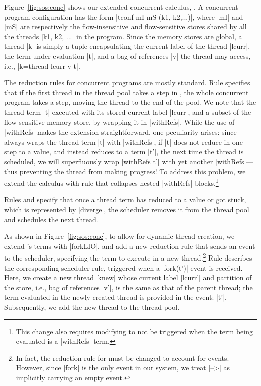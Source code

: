 Figure~\ref{fig:sos:conc} shows our extended concurrent calculus, \lioconc{}.
%
A concurrent program configuration has the form |tconf mI mS (k1, k2,...)|,
where |mI| and |mS| are respectively the flow-insensitive and flow-sensitive
stores shared by all the threads |k1, k2, ...| in the program.
%
Since the memory stores are global, a thread |k| is simply a tuple
encapsulating the current label of the thread |lcurr|, the term under
evaluation |t|, and a bag of references |v| the thread may access, i.e.,
|k=thread lcurr v t|.

The reduction rules for concurrent programs are mostly standard.
%
Rule  specifies that if the first thread in the thread pool
takes a step in \lioafs{}, the whole concurrent program takes a step, moving
the thread to the end of the pool.
%
We note that the thread term |t| executed with its stored current label
|lcurr|, and a subset of the flow-sensitive memory store, by wrapping it in
|withRefs|.
%
While the use of |withRefs| makes the extension straightforward, one
peculiarity arises: since  always wraps the thread term |t|
with |withRefs|, if |t| does not reduce in one step to a value, and instead
reduces to a term |t'|, the next time the thread is scheduled, we will superfluously
wrap |withRefs t'| with yet another |withRefs|---thus preventing the thread
from making progress!
%
To address this problem, we extend the calculus with rule  that
collapses nested |withRefs| blocks.\footnote{
This change also requires modifying  to not be triggered when
the term being evaluated is a |withRefs| term.
}
 
Rules  and  specify that once a thread term
has reduced to a value or got stuck, which is represented by |diverge|, the
scheduler removes it from the thread pool and schedules the next thread.

%
As shown in Figure~\ref{fig:sos:conc}, to allow for dynamic thread creation, we
extend \lioafs{}'s terms with |forkLIO|, and add a new reduction rule that sends
an event to the scheduler, specifying the term to execute in a new
thread.\footnote{
In fact, the reduction rule for \lioafs{} must be changed to account for events.
However, since |fork| is the only event in our system, we treat |-->| as
implicitly carrying an empty event.
}
%
Rule  describes the corresponding scheduler rule, triggered
when a |fork(t')| event is received.
%
Here, we create a new thread |knew| whose current label |lcurr'| and partition
of the store, i.e., bag of references |v'|, is the same as that of the parent
thread; the term evaluated in the newly created thread is provided in the
event: |t'|.
%
Subsequently, we add the new thread to the thread pool.

